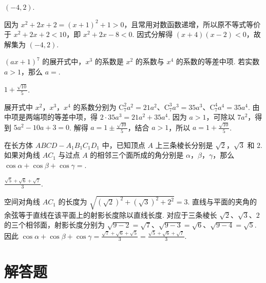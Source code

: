 \documentclass[UTF8,a4paper,oneside,11pt]{ctexbook}
\begin{document}
\begin{answer}
\((-4,2)\).
\end{answer}

\begin{solution}
因为 \(x^2+2x+2=(x+1)^2+1>0\)，且常用对数函数递增，所以原不等式等价于 \(x^2+2x+2<10\)，即 \(x^2+2x-8<0\). 因式分解得 \((x+4)(x-2)<0\)，故解集为 \((-4,2)\).
\end{solution}

\begin{problem}
\(\left(ax + 1\right)^7\) 的展开式中，\(x^3\) 的系数是 \(x^2\) 的系数与 \(x^4\) 的系数的等差中项. 若实数 \(a > 1\)，那么 \(a=\)\fillinblank{}.
\end{problem}

\begin{answer}
\(1+\frac{\sqrt{10}}{5}\).
\end{answer}

\begin{solution}
展开式中 \(x^2\)，\(x^3\)，\(x^4\) 的系数分别为 \(\mathrm C_7^2a^2=21a^2\)、\(\mathrm C_7^3a^3=35a^3\)、\(\mathrm C_7^4a^4=35a^4\). 由中项是两端项的等差中项，得 \(2\cdot35a^3=21a^2+35a^4\). 因为 \(a>1\)，可除以 \(7a^2\)，得到 \(5a^2-10a+3=0\). 解得 \(a=1\pm\frac{\sqrt{10}}5\)，结合 \(a>1\)，所以 \(a=1+\frac{\sqrt{10}}5\).
\end{solution}

\begin{problem}
在长方体 \(ABCD - A_{1}B_{1}C_{1}D_{1}\) 中，已知顶点 \(A\) 上三条棱长分别是 \(\sqrt{2}\)，\(\sqrt{3}\) 和 \(2\). 如果对角线 \(AC_{1}\) 与过点 \(A\) 的相邻三个面所成的角分别是 \(\alpha\)，\(\beta\)，\(\gamma\)，那么 \(\cos \alpha + \cos \beta + \cos \gamma=\)\fillinblank{}.
\end{problem}

\begin{answer}
\(\frac{\sqrt5+\sqrt6+\sqrt7}{3}\).
\end{answer}

\begin{solution}
空间对角线 \(AC_1\) 的长度为 \(\sqrt{(\sqrt2)^2+(\sqrt3)^2+2^2}=3\). 直线与平面的夹角的余弦等于直线在该平面上的射影长度除以直线长度. 对应于三条棱长 \(\sqrt2\)、\(\sqrt3\)、\(2\) 的三个相邻面，射影长度分别为 \(\sqrt{9-2}=\sqrt7\)、\(\sqrt{9-3}=\sqrt6\)、\(\sqrt{9-4}=\sqrt5\). 因此 \(\cos\alpha+\cos\beta+\cos\gamma=\frac{\sqrt7+\sqrt6+\sqrt5}{3}=\frac{\sqrt5+\sqrt6+\sqrt7}{3}\).
\end{solution}

\section{解答题}
\end{document}
